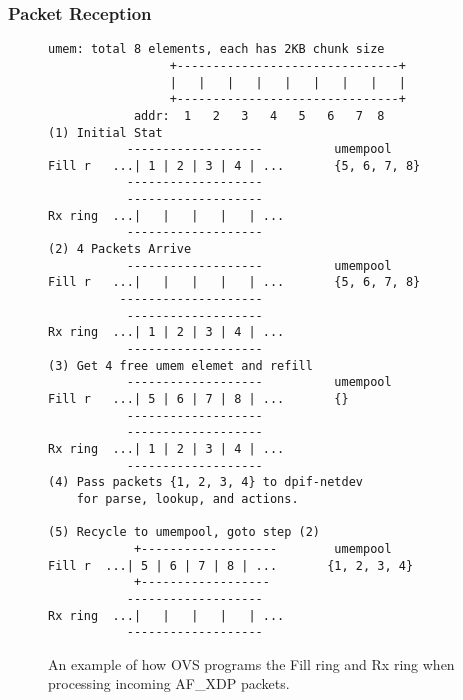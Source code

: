 \documentclass[10pt,numbers,reprint]{sigplanconf}
\begin{document}
\subsubsection{Packet Reception}
\begin{figure}
{\scriptsize
\begin{verbatim}
umem: total 8 elements, each has 2KB chunk size
                 +-------------------------------+
                 |   |   |   |   |   |   |   |   |
                 +-------------------------------+
            addr:  1   2   3   4   5   6   7  8 
(1) Initial Stat
           -------------------          umempool
Fill r   ...| 1 | 2 | 3 | 4 | ...       {5, 6, 7, 8}
           -------------------
           -------------------
Rx ring  ...|   |   |   |   | ...
           -------------------
(2) 4 Packets Arrive
           -------------------          umempool
Fill r   ...|   |   |   |   | ...       {5, 6, 7, 8}
          --------------------
           -------------------
Rx ring  ...| 1 | 2 | 3 | 4 | ...
           -------------------
(3) Get 4 free umem elemet and refill
           -------------------          umempool
Fill r   ...| 5 | 6 | 7 | 8 | ...       {} 
           -------------------
           -------------------
Rx ring  ...| 1 | 2 | 3 | 4 | ...
           -------------------
(4) Pass packets {1, 2, 3, 4} to dpif-netdev
    for parse, lookup, and actions.

(5) Recycle to umempool, goto step (2)
            +-------------------        umempool
Fill r  ...| 5 | 6 | 7 | 8 | ...       {1, 2, 3, 4}
            +------------------
           -------------------
Rx ring  ...|   |   |   |   | ...
           -------------------
\end{verbatim}
}
\vspace{-1.0em}
\caption{An example of how OVS programs the Fill ring and Rx ring when
processing incoming AF\_XDP packets.}
\label{afxdprx}
\vspace{-1.0em}
\end{figure}
\end{document}
